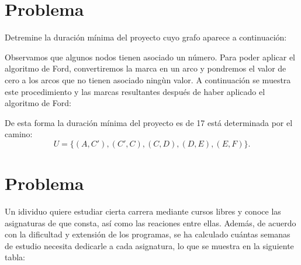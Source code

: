 \documentclass[autocontact]{gaceta}
\begin{document}
\section{Problema}
        Detremine la duración mínima del proyecto cuyo grafo aparece a continuación:
        
        \pagebreak
        Observamos que algunos nodos tienen asociado un número. Para poder aplicar el 
        algoritmo de Ford, convertiremos la marca en un arco y pondremos el valor de cero 
        a los arcos que no tienen asociado ningùn valor. A continuación se muestra este 
        procedimiento y las marcas resultantes después de haber aplicado el algoritmo de 
        Ford:
        
        De esta forma la duración mínima del proyecto es de 17 está determinada por el 
        camino:
        \begin{equation}
            U = \{ (A,C'), (C',C), (C,D), (D,E), (E,F) \}.
        \end{equation}


\section{Problema}
        Un idividuo quiere estudiar cierta carrera mediante cursos libres y conoce las asignaturas 
        de que consta, así como las reaciones entre ellas. Además, de acuerdo con la dificultad y 
        extensión de los programas, se ha calculado cuántas semanas de estudio necesita dedicarle 
        a cada asignatura, lo que se muestra en la siguiente tabla:
\end{document}
